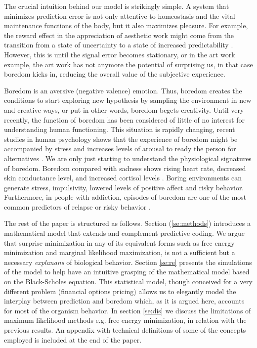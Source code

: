 \documentclass[11pt, onecolumn]{article}
\begin{document}
The crucial intuition behind our model is strikingly simple.
A system that minimizes prediction error is not only attentive to homeostasis and the vital maintenance functions of the body, but it also maximizes pleasure. For example, the reward effect in the appreciation of aesthetic work might come from the transition from a state of uncertainty to a state of increased predictability \citep{van_de_cruys_putting_2011}.
However, this is until the signal error becomes stationary, or in the art work example, the art work has not anymore the potential of surprising us, in that case boredom kicks in, reducing the overall value of the subjective experience.

Boredom is an aversive (negative valence) emotion. Thus, boredom creates the conditions to start exploring new hypothesis by sampling the environment in new and creative ways, or put in other words, boredom begets creativity. 
Until very recently, the function of boredom has been considered of little of no interest for understanding human functioning. This situation is rapidly changing, 
recent studies in human psychology shows that the experience of boredom might be accompanied by stress and increases levels of arousal to ready the person for alternatives \citep{posner_neurophysiological_2009} \citep{bench_function_2013}. We are only just starting to understand the physiological signatures of boredom. Boredom compared with sadness shows rising heart rate, decreased skin conductance level, and increased cortisol levels \citep{merrifield_characterizing_2014}. Boring environments can generate stress, impulsivity, lowered levels of positive affect and risky behavior. Furthermore, in people with addiction, episodes of  boredom are one of the most common predictors of relapse or risky behavior \citep{blaszczynski_boredom_1990}.

The rest of the paper is structured as follows. Section (\ref{se:methods})  introduces a mathematical model that extends and complement predictive coding. We argue that surprise minimization in any of its equivalent forms such as free energy minimization and marginal likelihood maximization, is not a sufficient but a necessary \emph{explanans} of biological behavior. Section \ref{se:re} presents the simulations of the model to help have an intuitive grasping of the mathematical model based on the Black-Scholes equation. This statistical model, though conceived for a very different problem (financial options pricing) allows us to elegantly model the interplay between prediction and boredom which, as it is argued here, accounts for most of the organism behavior.
In section \ref{se:dis} we discuss the limitations of maximum likelihood methods e.g. free energy minimization, in relation with the previous results.
An appendix with technical definitions of some of the concepts employed is included at the end of the paper.
\end{document}
